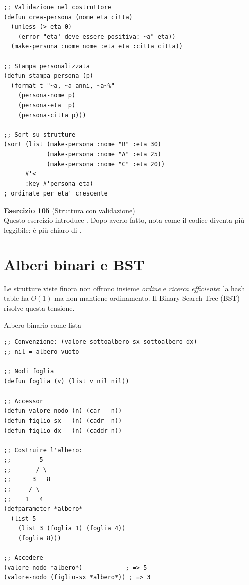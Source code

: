 \begin{esempio}
\begin{lstlisting}
;; Validazione nel costruttore
(defun crea-persona (nome eta citta)
  (unless (> eta 0)
    (error "eta' deve essere positiva: ~a" eta))
  (make-persona :nome nome :eta eta :citta citta))

;; Stampa personalizzata
(defun stampa-persona (p)
  (format t "~a, ~a anni, ~a~%"
    (persona-nome p)
    (persona-eta  p)
    (persona-citta p)))

;; Sort su strutture
(sort (list (make-persona :nome "B" :eta 30)
            (make-persona :nome "A" :eta 25)
            (make-persona :nome "C" :eta 20))
      #'<
      :key #'persona-eta)
; ordinate per eta' crescente
\end{lstlisting}
\end{esempio}

\begin{workbook}
\textbf{Esercizio 105}
(Struttura  con validazione)\\[4pt]
Questo esercizio introduce .
Dopo averlo fatto, nota come il codice diventa più leggibile:
 è più chiaro di .
\end{workbook}

\section{Alberi binari e BST}

Le strutture viste finora non offrono insieme \emph{ordine} e
\emph{ricerca efficiente}: la hash table ha $O(1)$ ma non mantiene
ordinamento. Il Binary Search Tree (BST) risolve questa tensione.

\begin{concetto}{Albero binario come lista}
\end{concetto}

\begin{esempio}
\begin{lstlisting}
;; Convenzione: (valore sottoalbero-sx sottoalbero-dx)
;; nil = albero vuoto

;; Nodi foglia
(defun foglia (v) (list v nil nil))

;; Accessor
(defun valore-nodo (n) (car   n))
(defun figlio-sx   (n) (cadr  n))
(defun figlio-dx   (n) (caddr n))

;; Costruire l'albero:
;;        5
;;       / \
;;      3   8
;;     / \
;;    1   4
(defparameter *albero*
  (list 5
    (list 3 (foglia 1) (foglia 4))
    (foglia 8)))

;; Accedere
(valore-nodo *albero*)            ; => 5
(valore-nodo (figlio-sx *albero*)) ; => 3
\end{lstlisting}
\end{esempio}

